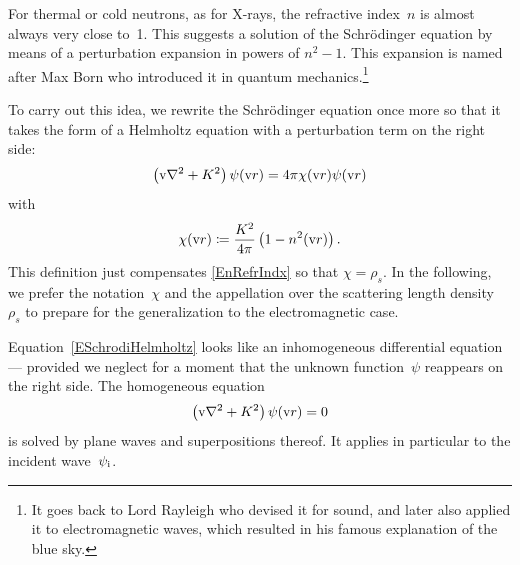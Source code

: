 For thermal or cold neutrons,
as for X-rays, the refractive index~$n$ is almost always
very close to~1.
This suggests a solution of the Schrödinger equation
by means of a perturbation expansion in powers of $n^2-1$.
This expansion is named after Max Born
who introduced it in quantum mechanics.\footnote
{It goes back to Lord Rayleigh
who devised it for sound,
and later also applied it to electromagnetic waves,
which resulted in his famous explanation of the blue sky.}

To carry out this idea, we rewrite the Schrödinger equation
once more so that it takes the form of a Helmholtz equation
%
with a perturbation term on the right side:
\begin{equation}\label{ESchrodiHelmholtz}
  \left(\text{v}{\nabla}^2+K^2\right)\psi(\text{v}{r})
  = 4\pi\chi(\text{v}{r})\psi(\text{v}{r})
\end{equation}
with
\begin{equation}\label{EChiDef}
  \chi(\text{v}{r}) \coloneqq  \frac{K^2}{4\pi}\left(1-n^2(\text{v}{r})\right).
\end{equation}
%
This definition just compensates \cref{EnRefrIndx} so that $\chi=\rho_s$.
In the following, we prefer the notation~$\chi$
and the appellation 
%
%
over the scattering length density~$\rho_s$
to prepare for the generalization to the electromagnetic case.

Equation~\cref{ESchrodiHelmholtz} looks
like an inhomogeneous differential equation ---
provided we neglect for a moment that the unknown function~$\psi$
reappears on the right side.
The homogeneous equation
\begin{equation}\label{EHelmholtzHomog}
  \left(\text{v}{\nabla}^2+K^2\right)\psi(\text{v}{r}) = 0
\end{equation}
is solved by plane waves and superpositions thereof.
It applies in particular to the incident wave~$\psi_{\text{i}}$.

